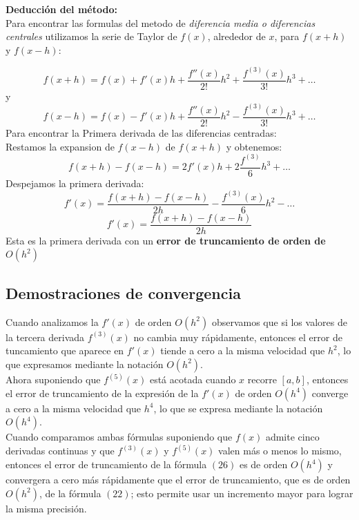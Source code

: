 \documentclass[journal,transmag]{IEEEtran}
\theoremstyle{mytheoremstyle}
\theoremstyle{mytheoremstyle}
\theoremstyle{myproblemstyle}
\begin{document}
    \textbf{Deducción del método:}\\
    
    Para encontrar las formulas del metodo de \textit{diferencia media o diferencias centrales} utilizamos la serie de Taylor de $f(x)$, alrededor de $x$, para $f(x+h)$ y $f(x-h)$:
    
    \begin{equation}
        f(x+h) = f(x)+f'(x)h + \frac{f''(x)}{2!}h^2 + \frac{f^{(3)}(x)}{3!}h^3 + \ldots
    \end{equation}
    y
    \begin{equation}
        f(x-h) = f(x)-f'(x)h + \frac{f''(x)}{2!}h^2 - \frac{f^{(3)}(x)}{3!}h^3 + \ldots
    \end{equation}
    Para encontrar la Primera derivada de las diferencias centradas:\\
    Restamos la expansion de $f(x-h)$ de $f(x+h)$ y obtenemos:
        \begin{equation}
            f(x+h)-f(x-h) = 2f'(x)h+2\frac{f^{(3)}}{6}h^3+\ldots
        \end{equation}
    Despejamos la primera derivada:
        \begin{equation}
            f'(x)=\frac{f(x+h)-f(x-h)}{2h}-\frac{f^{(3)}(x)}{6}h^2-\ldots
        \end{equation}
        \begin{equation}
            \boxed{f'(x)=\frac{f(x+h)-f(x-h)}{2h}}
        \end{equation}
    Esta es la primera derivada con un \textbf{error de truncamiento de orden de $O(h^2)$}
\subsection{Demostraciones de convergencia}
Cuando analizamos la $f'(x)$ de orden $O(h^2)$ observamos que si los valores de la tercera derivada $f^{(3)}(x)$ no cambia muy rápidamente, entonces el error de tuncamiento que aparece en $f'(x)$ tiende a cero a la misma velocidad que $h^2$, lo que expresamos mediante la notación $O(h^2)$.\\

Ahora suponiendo que $f^{(5)}(x)$ está acotada cuando $x$ recorre $[a,b]$, entonces el error de truncamiento de la expresión de la $f'(x)$ de orden $O(h^4)$ converge a cero a la misma velocidad que $h^4$, lo que se expresa mediante la notación $O(h^4)$.\\

Cuando comparamos ambas fórmulas suponiendo que $f(x)$ admite cinco derivadas continuas y que $f^{(3)}(x)$ y $f^{(5)}(x)$ valen más o menos lo mismo, entonces el error de truncamiento de la fórmula $(26)$ es de orden $O(h^4)$ y convergera a cero más rápidamente que el error de truncamiento, que es de orden $O(h^2)$, de la fórmula $(22)$; esto permite usar un incremento mayor para lograr la misma precisión.
\end{document}
